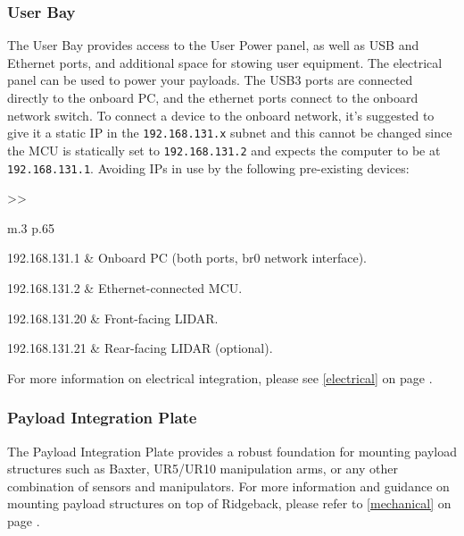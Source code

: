 \documentclass[]{clearpath-latex/clearpath-manual}
\begin{document}
\pagebreak[4]
\subsubsection{User Bay}\label{userbay}

The User Bay provides access to the User Power panel, as well as USB and Ethernet ports, and additional space for stowing user equipment.  The electrical panel can be used to power your payloads. The USB3 ports are connected directly to the onboard PC, and the ethernet ports connect to the onboard network switch. To connect a device to the onboard network, it's suggested to give it a static IP in the \lstinline{192.168.131.x} subnet and this cannot be changed since the MCU is statically set to \lstinline{192.168.131.2} and expects the computer to be at \lstinline{192.168.131.1}.  Avoiding IPs in use by the following pre-existing devices:

\bgroup
\def\arraystretch{1.2}%
\begin{table}[h]
	\centering
	\begin{tabular}{>{}>{\raggedright}m{.3\textwidth} p{.65\textwidth}} \hline

	192.168.131.1 & Onboard PC (both ports, br0 network interface). \\ \hline

	192.168.131.2 & Ethernet-connected MCU. \\ \hline

	192.168.131.20 & Front-facing LIDAR. \\ \hline

	192.168.131.21 & Rear-facing LIDAR (optional). \\ \hline

	\end{tabular}
\newline
\caption{Ridgeback Onboard Network Devices}
\label{netdevs}
\end{table}
\egroup

For more information on electrical integration, please see \autoref{electrical} on page \pageref{electrical}.


\subsubsection{Payload Integration Plate}

The Payload Integration Plate provides a robust foundation for mounting payload structures such as Baxter, UR5/UR10 manipulation arms, or any other combination of sensors and manipulators.   For more information and guidance on mounting payload structures on top of Ridgeback, please refer to \autoref{mechanical} on page \pageref{mechanical}.
\end{document}
